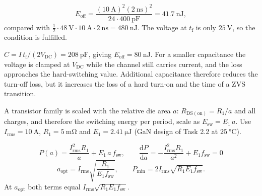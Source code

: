 \begin{solutionblock}
	\begin{equation}
		E_\mathrm{off} = \frac{(\SI{10}{\ampere})^2(\SI{2}{\nano\second})^2}{24\cdot\SI{400}{\pico\farad}} = \SI{41.7}{\nano\joule},
	\end{equation}
	compared with $\frac{1}{2}\cdot\SI{48}{\volt}\cdot\SI{10}{\ampere}\cdot\SI{2}{\nano\second}=\SI{480}{\nano\joule}$. The voltage at $t_\mathrm{f}$ is only $\SI{25}{\volt}$, so the condition is fulfilled.
\end{solutionblock}


\begin{solutionblock}
	$C=I\,t_\mathrm{f}/(2V_\mathrm{DC})=\SI{208}{\pico\farad}$, giving $E_\mathrm{off}=\SI{80}{\nano\joule}$. For a smaller capacitance the voltage is clamped at $V_\mathrm{DC}$ while the channel still carries current, and the loss approaches the hard-switching value. Additional capacitance therefore reduces the turn-off loss, but it increases the loss of a hard turn-on and the time of a ZVS transition.
\end{solutionblock}



A transistor family is scaled with the relative die area $a$: $R_\mathrm{DS(on)}=R_1/a$ and all charges, and therefore the switching energy per period, scale as $E_\mathrm{sw}=E_1\,a$. Use $I_\mathrm{rms}=\SI{10}{\ampere}$, $R_1=\SI{5}{\milli\ohm}$ and $E_1=\SI{2.41}{\micro\joule}$ (GaN design of Task 2.2 at $\SI{25}{\celsius}$).


\begin{solutionblock}
	\begin{equation}
		P(a) = \frac{I_\mathrm{rms}^2R_1}{a} + E_1\,a\,f_\mathrm{sw},\qquad
		\frac{\mathrm{d}P}{\mathrm{d}a} = -\frac{I_\mathrm{rms}^2R_1}{a^2} + E_1f_\mathrm{sw} = 0
	\end{equation}
	\begin{equation}
		a_\mathrm{opt} = I_\mathrm{rms}\sqrt{\frac{R_1}{E_1f_\mathrm{sw}}},\qquad
		P_\mathrm{min} = 2I_\mathrm{rms}\sqrt{R_1E_1f_\mathrm{sw}}.
	\end{equation}
	At $a_\mathrm{opt}$ both terms equal $I_\mathrm{rms}\sqrt{R_1E_1f_\mathrm{sw}}$.
\end{solutionblock}


